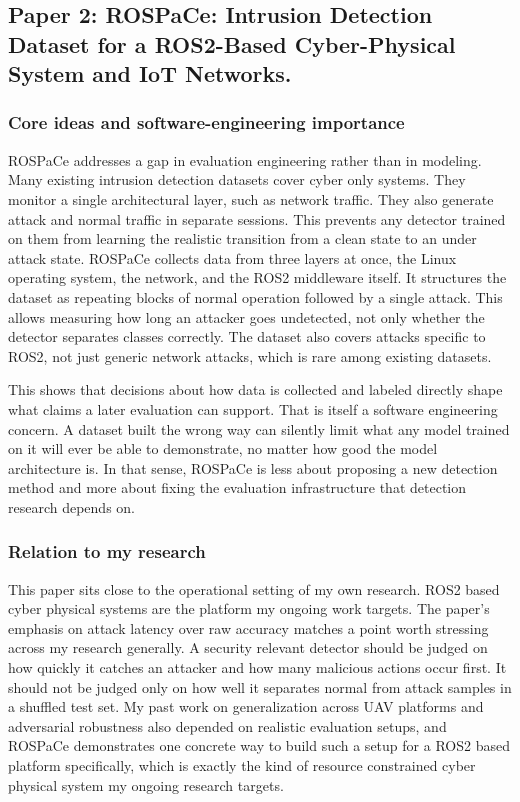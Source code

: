 \documentclass[11pt,a4paper]{article}
\begin{document}
\subsection{Paper 2: ROSPaCe: Intrusion Detection Dataset for a ROS2-Based
Cyber-Physical System and IoT Networks.}

\subsubsection{Core ideas and software-engineering importance}
ROSPaCe addresses a gap in evaluation engineering rather than in modeling. Many existing intrusion detection datasets cover cyber only systems. They monitor a single architectural layer, such as network traffic. They also generate attack and normal traffic in separate sessions. This prevents any detector trained on them from learning the realistic transition from a clean state to an under attack state. ROSPaCe collects data from three layers at once, the Linux operating system, the network, and the ROS2 middleware itself. It structures the dataset as repeating blocks of normal operation followed by a single attack. This allows measuring how long an attacker goes undetected, not only whether the detector separates classes correctly. The dataset also covers attacks specific to ROS2, not just generic network attacks, which is rare among existing datasets.

This shows that decisions about how data is collected and labeled directly shape what claims a later evaluation can support. That is itself a software engineering concern. A dataset built the wrong way can silently limit what any model trained on it will ever be able to demonstrate, no matter how good the model architecture is. In that sense, ROSPaCe is less about proposing a new detection method and more about fixing the evaluation infrastructure that detection research depends on.

\subsubsection{Relation to my research}
This paper sits close to the operational setting of my own research. ROS2 based cyber physical systems are the platform my ongoing work targets. The paper's emphasis on attack latency over raw accuracy matches a point worth stressing across my research generally. A security relevant detector should be judged on how quickly it catches an attacker and how many malicious actions occur first. It should not be judged only on how well it separates normal from attack samples in a shuffled test set. My past work on generalization across UAV platforms and adversarial robustness also depended on realistic evaluation setups, and ROSPaCe demonstrates one concrete way to build such a setup for a ROS2 based platform specifically, which is exactly the kind of resource constrained cyber physical system my ongoing research targets.
\end{document}
